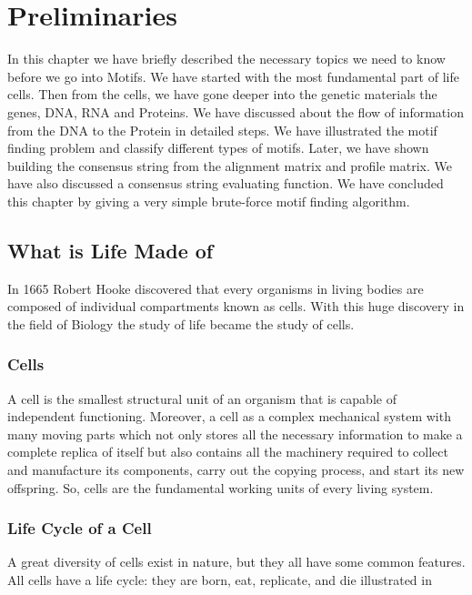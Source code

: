 \chapter{Preliminaries}\label{preliminaries}
In this chapter we have briefly described the necessary topics we need to
know before we go into Motifs. We have started with the most fundamental
part of life cells. Then from the cells, we have gone deeper into the genetic
materials the genes, DNA, RNA and Proteins. We have discussed about the flow
of information from the DNA to the Protein in detailed steps. We have illustrated the motif finding problem and classify different types of motifs. Later, we have shown building the consensus string from the alignment matrix and profile matrix. We have also discussed a consensus string evaluating function. We have concluded this chapter by giving a very simple brute-force motif finding algorithm.

\section{What is Life Made of}
In 1665 Robert Hooke discovered that every organisms
in living bodies are composed of individual compartments
known as cells. With this huge discovery in
the field of Biology the study of life became the study of cells.

\subsection{Cells}
A cell is the smallest structural unit of an organism that
is capable of independent functioning. Moreover, a cell as a complex mechanical system with many moving parts which not only stores all the necessary information to make a
complete replica of itself but also contains all the machinery required to collect
and manufacture its components, carry out the copying process, and start its new offspring. So, cells are the fundamental working units of every living system.

\subsection{Life Cycle of a Cell}
A great diversity of cells exist in nature, but they all have some common
features. All cells have a life cycle: they are born, eat, replicate, and die
illustrated in 

